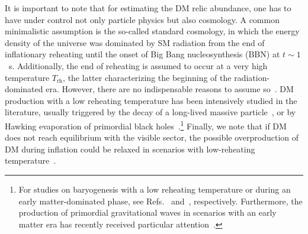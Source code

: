 \documentclass[a4paper,11pt]{article}
\newcommand{\Trh}{T_\text{rh}}
\begin{document}
It is important to note that for estimating the DM relic abundance, one has to have under control not only particle physics but also cosmology.
A common minimalistic assumption is the so-called standard cosmology, in which the energy density of the universe was dominated by SM radiation from the end of inflationary reheating until the onset of Big Bang nucleosynthesis (BBN) at $t \sim 1$~s.
Additionally, the end of reheating is assumed to occur at a very high temperature $\Trh$, the latter characterizing the beginning of the radiation-dominated era.
However, there are no indispensable reasons to assume so~\cite{Allahverdi:2020bys}.
DM production with a low reheating temperature has been intensively studied in the literature, usually triggered by the decay of a long-lived massive particle~\cite{Giudice:2000ex, Fornengo:2002db, Gelmini:2006pw, Drees:2006vh, Roszkowski:2014lga, Drees:2017iod, Bernal:2018ins, Bernal:2018kcw, Arias:2021rer, Bernal:2022wck}, or by Hawking evaporation of primordial black holes~\cite{Green:1999yh, Khlopov:2004tn, Dai:2009hx, Fujita:2014hha, Allahverdi:2017sks, Lennon:2017tqq, Morrison:2018xla, Hooper:2019gtx, Chaudhuri:2020wjo, Masina:2020xhk, Baldes:2020nuv, Gondolo:2020uqv, Bernal:2020kse, Bernal:2020ili, Bernal:2020bjf, Bernal:2021akf, Cheek:2021odj, Cheek:2021cfe, Bernal:2021yyb, Bernal:2021bbv, Bernal:2022oha, Cheek:2022dbx, Mazde:2022sdx, Cheek:2022mmy}.\footnote{For studies on baryogenesis with a low reheating temperature or during an early matter-dominated phase, see Refs.~\cite{Davidson:2000dw, Giudice:2000ex, Allahverdi:2010im, Beniwal:2017eik, Allahverdi:2017edd} and~\cite{Bernal:2017zvx, Chen:2019etb, Bernal:2022pue, Chakraborty:2022gob}, respectively. Furthermore, the production of primordial gravitational waves in scenarios with an early matter era has recently received particular attention~\cite{Assadullahi:2009nf, Durrer:2011bi, Alabidi:2013lya, DEramo:2019tit, Bernal:2019lpc, Figueroa:2019paj, Bernal:2020ywq}.}
Finally, we note that if DM does not reach equilibrium with the visible sector, the possible overproduction of DM during inflation could be relaxed in scenarios with low-reheating temperature~\cite{Garcia:2022vwm, Kaneta:2022gug, Garcia:2023qab, Cosme:2023xpa}.
\end{document}
